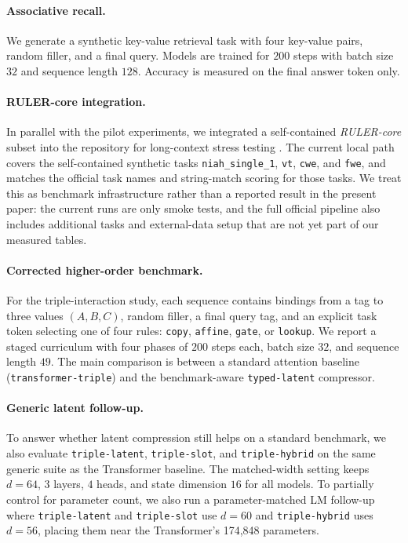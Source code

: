 \documentclass[11pt]{article}
\begin{document}
\paragraph{Associative recall.}
We generate a synthetic key-value retrieval task with four key-value pairs,
random filler, and a final query. Models are trained for $200$ steps with batch
size $32$ and sequence length $128$. Accuracy is measured on the final answer
token only.

\paragraph{RULER-core integration.}
In parallel with the pilot experiments, we integrated a self-contained
\textit{RULER-core} subset into the repository for long-context stress testing
\citep{hsieh2024ruler}. The current local path covers the self-contained
synthetic tasks \texttt{niah\_single\_1}, \texttt{vt}, \texttt{cwe}, and
\texttt{fwe}, and matches the official task names and string-match scoring for
those tasks. We treat this as benchmark infrastructure rather than a reported
result in the present paper: the current runs are only smoke tests, and the
full official pipeline also includes additional tasks and external-data setup
that are not yet part of our measured tables.

\paragraph{Corrected higher-order benchmark.}
For the triple-interaction study, each sequence contains bindings from a tag to
three values \((A, B, C)\), random filler, a final query tag, and an explicit
task token selecting one of four rules: \texttt{copy}, \texttt{affine},
\texttt{gate}, or \texttt{lookup}. We report a staged curriculum with four
phases of $200$ steps each, batch size $32$, and sequence length $49$. The
main comparison is between a standard attention baseline
(\texttt{transformer-triple}) and the benchmark-aware
\texttt{typed-latent} compressor.

\paragraph{Generic latent follow-up.}
To answer whether latent compression still helps on a standard benchmark, we
also evaluate \texttt{triple-latent}, \texttt{triple-slot}, and
\texttt{triple-hybrid} on the same generic suite as the Transformer baseline.
The matched-width setting keeps $d=64$, $3$ layers, $4$ heads, and state
dimension $16$ for all models. To partially control for parameter count, we
also run a parameter-matched LM follow-up where \texttt{triple-latent} and
\texttt{triple-slot} use $d=60$ and \texttt{triple-hybrid} uses $d=56$, placing
them near the Transformer's 174{,}848 parameters.
\end{document}
